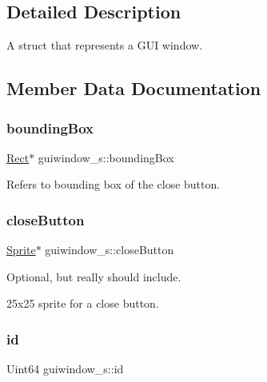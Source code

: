 \subsection{Detailed Description}
A struct that represents a G\+UI window. 

\subsection{Member Data Documentation}
\mbox{\label{structguiwindow__s_ac1cd7b4e29cbb1aebb92f3908a901a8f}} 
\subsubsection{\texorpdfstring{bounding\+Box}{boundingBox}}
{\footnotesize\ttfamily \hyperlink{structrect__s}{Rect}$\ast$ guiwindow\+\_\+s\+::bounding\+Box}



Refers to bounding box of the close button. 

\mbox{\label{structguiwindow__s_ac2a0369e93d29393cf3b5353a989dc9b}} 
\subsubsection{\texorpdfstring{close\+Button}{closeButton}}
{\footnotesize\ttfamily \hyperlink{struct_sprite___s}{Sprite}$\ast$ guiwindow\+\_\+s\+::close\+Button}



Optional, but really should include. 

25x25 sprite for a close button. \mbox{\label{structguiwindow__s_a8517fe666071281d8060f4f59459623f}} 
\subsubsection{\texorpdfstring{id}{id}}
{\footnotesize\ttfamily Uint64 guiwindow\+\_\+s\+::id}



